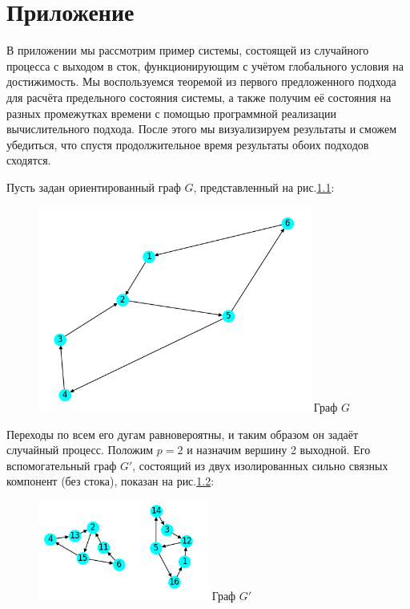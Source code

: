 \chapter{Приложение}

В приложении мы рассмотрим пример системы, состоящей из случайного процесса с выходом в сток, функционирующим с учётом глобального условия на достижимость.
Мы воспользуемся теоремой из первого предложенного подхода для расчёта предельного состояния системы, а также получим её состояния на разных промежутках времени с помощью программной реализации вычислительного подхода. После этого мы визуализируем результаты и сможем убедиться, что спустя продолжительное время результаты обоих подходов сходятся. 

Пусть задан ориентированный граф $G$, представленный на рис.\ref{fig:pic_4}:

\begin{figure}
	\centering	
	{\includegraphics[width=0.8\textwidth]{img/4.png}}
	{Граф $G$}
	\label{fig:pic_4}
\end{figure}

Переходы по всем его дугам равновероятны, и таким образом он задаёт случайный процесс. Положим $p = 2$ и назначим вершину 2 выходной. Его вспомогательный граф $G'$, состоящий из двух изолированных сильно связных компонент (без стока), показан на рис.\ref{fig:pic_5}:

\begin{figure}
	\centering	
	{\includegraphics[width=0.5\textwidth]{img/5.png}}
	{Граф $G'$}
	\label{fig:pic_5}
\end{figure}

